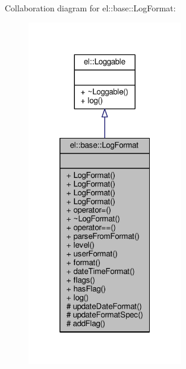 Collaboration diagram for el\+:\+:base\+:\+:Log\+Format\+:
\nopagebreak
\begin{figure}[H]
\begin{center}
\leavevmode
\includegraphics[width=193pt]{d0/d0e/classel_1_1base_1_1LogFormat__coll__graph}
\end{center}
\end{figure}
